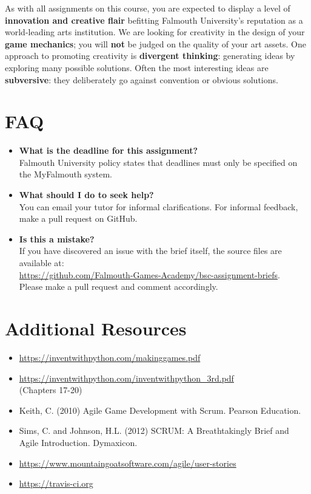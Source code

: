 \documentclass{../../fal_assignment}
\begin{document}
As with all assignments on this course, you are expected to display a level of
\textbf{innovation and creative flair} befitting Falmouth University's reputation as a world-leading
arts institution.
We are looking for creativity in the design of your \textbf{game mechanics};
you will \textbf{not} be judged on the quality of your art assets.
One approach to promoting creativity is
\textbf{divergent thinking}: generating ideas by exploring many possible solutions.
Often the most interesting ideas are \textbf{subversive}: they deliberately go against
convention or obvious solutions.

\section*{FAQ}

\begin{itemize}
	\item 	\textbf{What is the deadline for this assignment?} \\ 
    		Falmouth University policy states that deadlines must only be specified on the MyFalmouth system.
    		
	\item 	\textbf{What should I do to seek help?} \\ 
    		You can email your tutor for informal clarifications. For informal feedback, make a pull request on GitHub. 
    		
    	\item 	\textbf{Is this a mistake?} \\ 	
    		If you have discovered an issue with the brief itself, the source files are available at: \\
    		\url{https://github.com/Falmouth-Games-Academy/bsc-assignment-briefs}.\\
    		 Please make a pull request and comment accordingly.
\end{itemize}

\section*{Additional Resources}

\begin{itemize}
    \item \url{https://inventwithpython.com/makinggames.pdf}
    \item \url{https://inventwithpython.com/inventwithpython_3rd.pdf} \\ (Chapters 17-20)
    \item Keith, C. (2010) Agile Game Development with Scrum. Pearson Education.
    \item Sims, C. and Johnson, H.L. (2012) SCRUM: A Breathtakingly Brief and Agile Introduction. Dymaxicon.
    \item \url{https://www.mountaingoatsoftware.com/agile/user-stories}
    \item \url{https://travis-ci.org}
\end{itemize}
\end{document}

